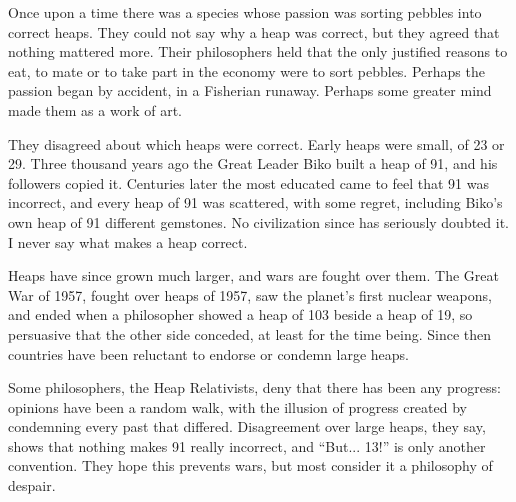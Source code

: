 
Once upon a time there was a species whose passion was sorting pebbles into correct heaps. They could not say why a heap was correct, but they agreed that nothing mattered more. Their philosophers held that the only justified reasons to eat, to mate or to take part in the economy were to sort pebbles. Perhaps the passion began by accident, in a Fisherian runaway. Perhaps some greater mind made them as a work of art.

They disagreed about which heaps were correct. Early heaps were small, of 23 or 29. Three thousand years ago the Great Leader Biko built a heap of 91, and his followers copied it. Centuries later the most educated came to feel that 91 was incorrect, and every heap of 91 was scattered, with some regret, including Biko's own heap of 91 different gemstones. No civilization since has seriously doubted it. I never say what makes a heap correct. 

Heaps have since grown much larger, and wars are fought over them. The Great War of 1957, fought over heaps of 1957, saw the planet's first nuclear weapons, and ended when a philosopher showed a heap of 103 beside a heap of 19, so persuasive that the other side conceded, at least for the time being. Since then countries have been reluctant to endorse or condemn large heaps. 

Some philosophers, the Heap Relativists, deny that there has been any progress: opinions have been a random walk, with the illusion of progress created by condemning every past that differed. Disagreement over large heaps, they say, shows that nothing makes 91 really incorrect, and ``But... 13!'' is only another convention. They hope this prevents wars, but most consider it a philosophy of despair. 

